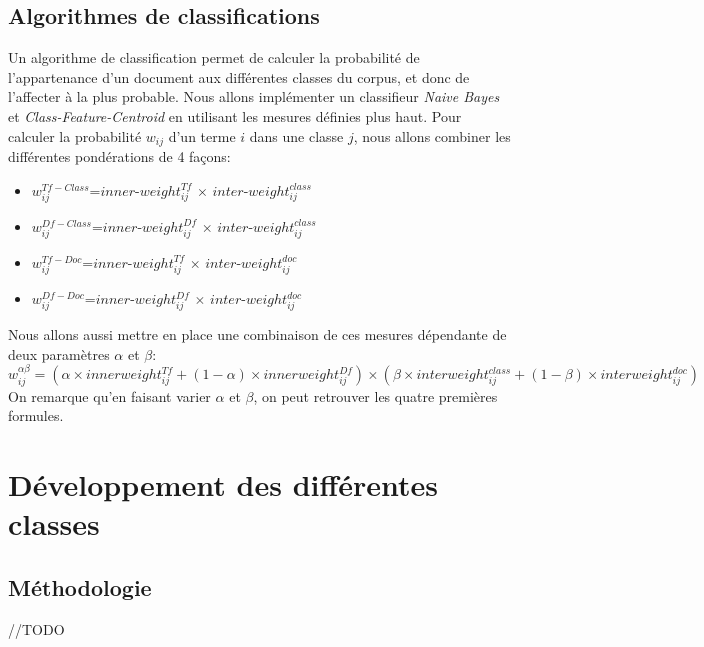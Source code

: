 \documentclass{article}
\begin{document}
\subsection{Algorithmes de classifications}
Un algorithme de classification permet de calculer la probabilité de l'appartenance d'un document aux différentes classes du corpus, et donc de l'affecter à la plus probable. Nous allons implémenter un classifieur \textit{Naive Bayes} et \textit{Class-Feature-Centroid}\cite{RNTIB} en utilisant les mesures définies plus haut. Pour calculer la probabilité $w_{ij}$ d'un terme $i$ dans une classe $j$, nous allons combiner les différentes pondérations de 4 façons:
\begin{itemize}
\item $w_{ij}^{Tf-Class}$=$inner$-$weight_{ij}^{Tf}$ $\times$ $inter$-$weight_{ij}^{class}$
\item $w_{ij}^{Df-Class}$=$inner$-$weight_{ij}^{Df}$ $\times$ $inter$-$weight_{ij}^{class}$
\item $w_{ij}^{Tf-Doc}$=$inner$-$weight_{ij}^{Tf}$ $\times$ $inter$-$weight_{ij}^{doc}$
\item $w_{ij}^{Df-Doc}$=$inner$-$weight_{ij}^{Df}$ $\times$ $inter$-$weight_{ij}^{doc}$
\end{itemize}
Nous allons aussi mettre en place une combinaison de ces mesures dépendante de deux paramètres $\alpha$ et $\beta$:
\[ w_{ij}^{ \alpha \beta}=(\alpha \times innerweight_{ij}^{Tf} + (1-\alpha)\times innerweight_{ij}^{Df} )\times(\beta \times interweight_{ij}^{class} + (1-\beta) \times interweight_{ij}^{doc} )\]
On remarque qu'en faisant varier $\alpha$ et $\beta$, on peut retrouver les quatre premières formules.



\section{Développement des différentes classes}

\subsection{Méthodologie}
//TODO
\end{document}
